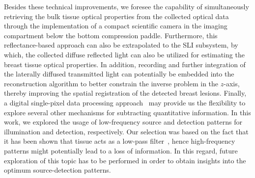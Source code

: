 Besides these technical improvements, we foresee the capability of simultaneously retrieving the bulk tissue optical properties from the collected optical data through the implementation of a compact scientific camera in the imaging compartment below the bottom compression paddle. Furthermore, this reflectance-based approach can also be extrapolated to the \ac{SLI} subsystem, by which, the collected diffuse reflected light can also be utilized for estimating the breast tissue optical properties. In addition, recording and further integration of the laterally diffused transmitted light can potentially be embedded into the reconstruction algorithm to better constrain the inverse problem in the $z$-axis, thereby improving the spatial registration of the detected breast lesions. Finally, a digital single-pixel data processing approach~\cite{Belanger2010,Pian2015} may provide us the flexibility to explore several other mechanisms for subtracting quantitative information. In this work, we explored the usage of low-frequency source and detection patterns for illumination and detection, respectively. Our selection was based on the fact that it has been shown that tissue acts as a low-pass filter~\cite{OSullivan2012}, hence high-frequency patterns might potentially lead to a loss of information. In this regard, future exploration of this topic has to be performed in order to obtain insights into the optimum source-detection patterns.



